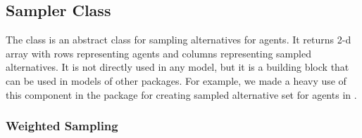 

\subsection{Sampler Class}
\label{sec:sampler}

The  class is an abstract class for sampling alternatives for agents.
It returns 2-d array with rows representing agents and columns representing sampled
alternatives. It is not directly used in any  model, but it is a building
block that can be used in models of other packages. For example, we made a
heavy use of this component in the  package for creating sampled
alternative set for agents in .

\subsubsection{Weighted Sampling}

